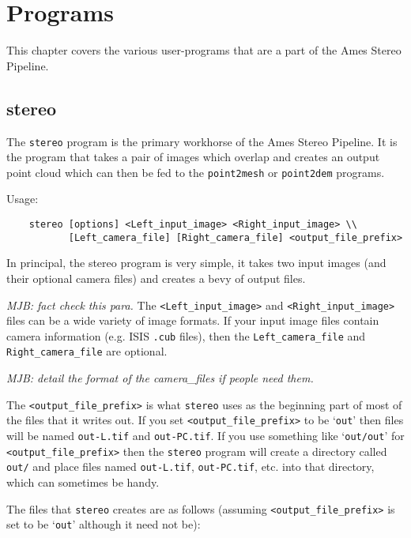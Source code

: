 \chapter{Programs}

This chapter covers the various user-programs that are a part of
the Ames Stereo Pipeline.

\section{stereo}
\label{stereo}

The \texttt{stereo} program is the primary workhorse of the Ames
Stereo Pipeline.  It is the program that takes a pair of images which
overlap and creates an output point cloud which can then be fed to the
\texttt{point2mesh} or \texttt{point2dem} programs.

\medskip

Usage:
\begin{verbatim}
    stereo [options] <Left_input_image> <Right_input_image> \\
           [Left_camera_file] [Right_camera_file] <output_file_prefix>
\end{verbatim}

\medskip

In principal, the stereo program is very simple, it takes two input
images (and their optional camera files) and creates a bevy of
output files.

\emph{MJB: fact check this para.}
The \verb=<Left_input_image>= and \verb=<Right_input_image>= files can be a wide variety of image formats.  If your input image files contain camera information (e.g. ISIS \verb=.cub= files), then the \verb=Left_camera_file= and \verb=Right_camera_file= are optional.

\emph{MJB: detail the format of the camera\_files if people need them.}

The \verb=<output_file_prefix>= is what \verb=stereo= uses as the
beginning part of most of the files that it writes out.  If you set
\verb=<output_file_prefix>= to be `\verb=out=' then files will be
named \verb=out-L.tif= and  \verb=out-PC.tif=.  If you use something
like `\verb=out/out=' for \verb=<output_file_prefix>= then the
\verb=stereo= program will create a directory called \verb=out/= and
place files named \verb=out-L.tif=, \verb=out-PC.tif=, etc. into
that directory, which can sometimes be handy.

The files that \verb=stereo= creates are as follows (assuming \verb=<output_file_prefix>= is set to be `\verb=out=' although it need not be):

